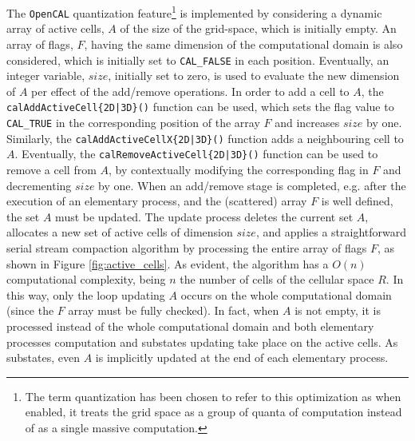 The \texttt{OpenCAL} quantization feature\footnote{The term quantization has been chosen to refer to this optimization as when enabled, it treats the grid space as a group of quanta of computation instead of as a single massive computation.} is implemented by considering a
dynamic array of active cells, $A$ of the size of the grid-space, which is initially empty. An
array of flags, $F$, having the same dimension of the computational
domain is also considered, which is initially set to
\verb'CAL_FALSE' in each position. Eventually, an integer variable,
$size$, initially set to zero, is used to evaluate the new dimension
of $A$ per effect of the add/remove operations. In order to add a
cell to $A$, the \verb'calAddActiveCell{2D|3D}()' function can be
used, which sets the flag value to \verb'CAL_TRUE' in the
corresponding position of the array $F$ and increases $size$ by
one. Similarly, the \verb'calAddActiveCellX{2D|3D}()' function adds
a neighbouring cell to $A$. Eventually, the
\verb'calRemoveActiveCell{2D|3D}()' function can be used to remove a
cell from $A$, by contextually modifying the corresponding flag in
$F$ and decrementing $size$ by one. When an add/remove stage is
completed, e.g. after the execution of an elementary process, and
the (scattered) array $F$ is well defined, the set $A$ must be
updated. The update process deletes the current set $A$, allocates a
new set of active cells of dimension $size$, and applies a
straightforward serial stream compaction algorithm by processing the
entire array of flags $F$, as shown in Figure
\ref{fig:active_cells}. As evident, the algorithm has a $O(n)$
computational complexity, being $n$ the number of cells of the
cellular space $R$. In this way, only the loop updating $A$ occurs
on the whole computational domain (since the $F$ array must be fully
checked). In fact, when $A$ is not empty, it is processed instead of
the whole computational domain and both elementary processes
computation and substates updating take place on the active
cells. As substates, even $A$ is implicitly updated at the end of
each elementary process. 


